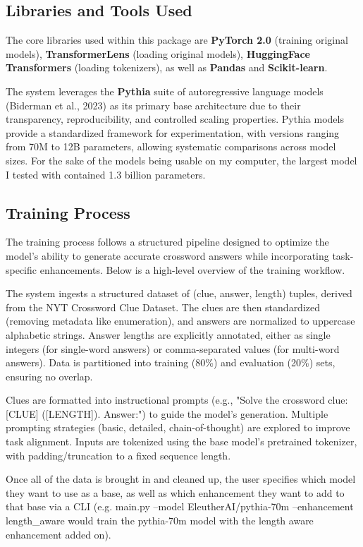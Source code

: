 \documentclass[
	a4paper, %
	10pt, %
	unnumberedsections, %
	twoside, %
]{LTJournalArticle}
\begin{document}
\subsection{Libraries and Tools Used}

The core libraries used within this package are \textbf{PyTorch 2.0} (training original models), \textbf{TransformerLens} (loading original models), \textbf{HuggingFace Transformers} (loading tokenizers), as well as \textbf{Pandas} and \textbf{Scikit-learn}.

\noindent The system leverages the \textbf{Pythia} suite of autoregressive language models (Biderman et al., 2023) \cite{biderman2023pythia} as its primary base architecture due to their transparency, reproducibility, and controlled scaling properties. Pythia models provide a standardized framework for experimentation, with versions ranging from 70M to 12B parameters, allowing systematic comparisons across model sizes. For the sake of the models being usable on my computer, the largest model I tested with contained 1.3 billion parameters.

\subsection{Training Process}

The training process follows a structured pipeline designed to optimize the model’s ability to generate accurate crossword answers while incorporating task-specific enhancements. Below is a high-level overview of the training workflow.

The system ingests a structured dataset of (clue, answer, length) tuples, derived from the NYT Crossword Clue Dataset. The clues are then standardized (removing metadata like enumeration), and answers are normalized to uppercase alphabetic strings. Answer lengths are explicitly annotated, either as single integers (for single-word answers) or comma-separated values (for multi-word answers). Data is partitioned into training (80\%) and evaluation (20\%) sets, ensuring no overlap.

Clues are formatted into instructional prompts (e.g., "Solve the crossword clue: [CLUE] ([LENGTH]). Answer:") to guide the model’s generation. Multiple prompting strategies (basic, detailed, chain-of-thought) are explored to improve task alignment. Inputs are tokenized using the base model’s pretrained tokenizer, with padding/truncation to a fixed sequence length.

Once all of the data is brought in and cleaned up, the user specifies which model they want to use as a base, as well as which enhancement they want to add to that base via a CLI (e.g. main.py --model EleutherAI/pythia-70m --enhancement length\_aware would train the pythia-70m model with the length aware enhancement added on).
\end{document}
